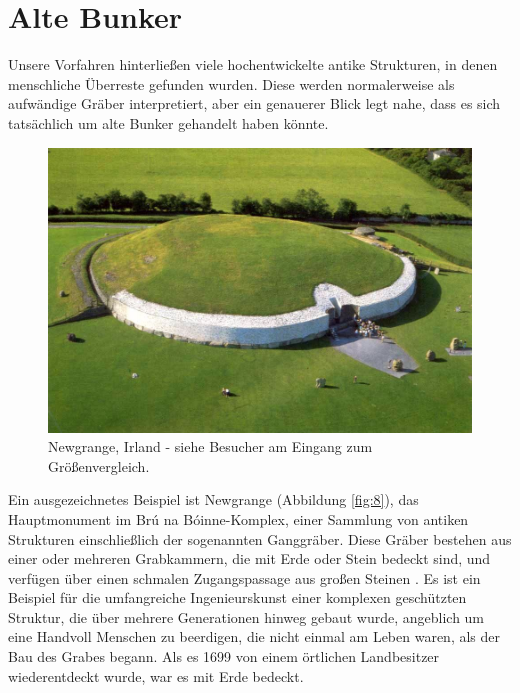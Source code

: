 \documentclass[10pt,twocolumn,letterpaper]{article}
\begin{document}
\section{Alte Bunker}
Unsere Vorfahren hinterließen viele hochentwickelte antike Strukturen, in denen menschliche Überreste gefunden wurden. Diese werden normalerweise als aufwändige Gräber interpretiert, aber ein genauerer Blick legt nahe, dass es sich tatsächlich um alte Bunker gehandelt haben könnte.

\begin{figure}[b]
\begin{center}
   \includegraphics[width=1\linewidth]{ww19.jpg}
\end{center}
   \caption{Newgrange, Irland - siehe Besucher am Eingang zum Größenvergleich.}
\label{fig:8}
\label{fig:onecol}
\end{figure}

Ein ausgezeichnetes Beispiel ist Newgrange (Abbildung \ref{fig:8}), das Hauptmonument im Brú na Bóinne-Komplex, einer Sammlung von antiken Strukturen einschließlich der sogenannten Ganggräber. Diese Gräber bestehen aus einer oder mehreren Grabkammern, die mit Erde oder Stein bedeckt sind, und verfügen über einen schmalen Zugangspassage aus großen Steinen \cite{70}. Es ist ein Beispiel für die umfangreiche Ingenieurskunst einer komplexen geschützten Struktur, die über mehrere Generationen hinweg gebaut wurde, angeblich um eine Handvoll Menschen zu beerdigen, die nicht einmal am Leben waren, als der Bau des Grabes begann. Als es 1699 von einem örtlichen Landbesitzer wiederentdeckt wurde, war es mit Erde bedeckt.
\end{document}
